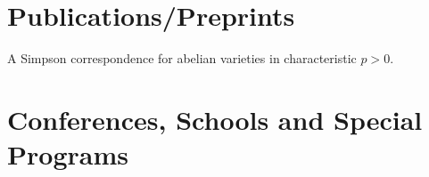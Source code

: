 \documentclass[10pt,a4paper,roman]{moderncv}
\begin{document}
\section{Publications/Preprints}

{A Simpson correspondence for abelian varieties in characteristic $p>0$.}


\section{Conferences, Schools and Special Programs}

\end{document}
